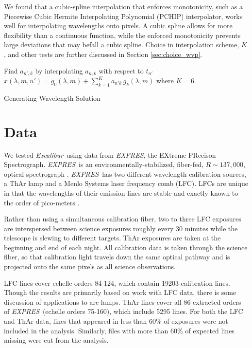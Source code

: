 \documentclass[modern]{aastex63}
\newcommand{\project}[1]{\textsl{#1}}
\newcommand{\name}{\project{Excalibur}}
\newcommand{\acronym}[1]{{\small{#1}}}
\newcommand{\expres}{\project{\acronym{EXPRES}}}
\begin{document}
We found that a cubic-spline interpolation that enforces monotonicity, such as a Piecewise Cubic Hermite Interpolating Polynomial (PCHIP) interpolator, works well for interpolating wavelengths onto pixels.  A cubic spline allows for more flexibility than a continuous function, while the enforced monotonicity prevents large deviations that may befall a cubic spline.  Choice in interpolation scheme, $K$, and other tests are further discussed in Section \ref{sec:choice_wvp}.

\begin{algorithm}
\SetAlgoLined
{}

Find $a_{n',k}$ by interpolating $a_{n,k}$ with respect to $t_{n'}$\;
$x(\lambda,m,n') = g_0(\lambda,m) + \sum_{k=1}^K a_{n'k}\,g_k(\lambda,m)$ where $K=6$\;
\caption{Generating Wavelength Solution}
\end{algorithm}


\section{Data} \label{sec:data}
We tested \name\ using data from \expres, the EXtreme PRecison Spectrograph.  \expres\ is an environmentally-stabilized, fiber-fed, $R\sim137,000$, optical spectrograph \citep{jurgenson2016, blackman2020}.  \expres\ has two different wavelength calibration sources, a ThAr lamp and a Menlo Systems laser frequency comb (LFC).  LFCs are unique in that the wavelengths of their emission lines are stable and exactly known to the order of pico-meters  \citep{wilken2012, molaro2013, probst2014}.

Rather than using a simultaneous calibration fiber, two to three LFC exposures are interspersed between science exposures roughly every 30 minutes while the telescope is slewing to different targets.  ThAr exposures are taken at the beginning and end of each night.  All calibration data is taken through the science fiber, so that calibration light travels down the same optical pathway and is projected onto the same pixels as all science observations.

LFC lines cover echelle orders 84-124, which contain 19203 calibration lines.  Though the results are primarily based on work with LFC data, there is some discussion of applications to arc lamps.   ThAr lines cover all 86 extracted orders of \expres\ (echelle orders 75-160), which include 5295 lines.  For both the LFC and ThAr data, lines that appeared in less than 60\% of exposures were not included in the analysis.  Similarly, files with more than 60\% of expected lines missing were cut from the analysis.  
\end{document}
